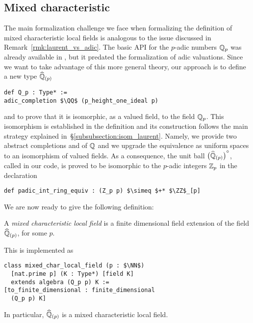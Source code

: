 \documentclass[sigplan,screen]{acmart}
\begin{document}
\subsection{Mixed characteristic}\label{subsec:mixed_char}
The main formalization challenge we face when formalizing the definition of mixed characteristic local fields is analogous to the issue discussed in Remark~\ref{rmk:laurent_vs_adic}. The basic API for the $p$-adic numbers $\mathbb{Q}_p$ was already available in \mathlib, but it predated the formalization of adic valuations. Since we want to take advantage of this more general theory, our approach is to define a new type $\widehat{\mathbb{Q}}_{(p)}$\href{https://github.com/mariainesdff/local_fields_journal/blob/0b408ff3af36e18f991f9d4cb87be3603cfc3fc3/src/padic_compare.lean#L95}{\extlink}
\begin{lstlisting}
def Q_p : Type* := 
adic_completion $\QQ$ (p_height_one_ideal p)
\end{lstlisting}
and to prove that it is isomorphic, as a valued field, to the field $\mathbb{Q}_p$. This isomorphism is established in the definition \href{https://github.com/mariainesdff/local_fields_journal/blob/0b408ff3af36e18f991f9d4cb87be3603cfc3fc3/src/padic_compare.lean#L274}{\extlink} and its construction follows the main strategy explained in~\S\ref{subsubsection:isom_laurent}. Namely, we provide two abstract completions  and  of $\mathbb{Q}$ and we upgrade the equivalence as uniform spaces to an isomorphism of valued fields. As a consequence, the unit ball ${\bigl(\widehat{\mathbb{Q}}_{(p)}\bigr)}^\circ$, called\href{https://github.com/mariainesdff/local_fields_journal/blob/0b408ff3af36e18f991f9d4cb87be3603cfc3fc3/src/padic_compare.lean#L332}{\extlink}  in our code,
is proved to be isomorphic to the $p$-adic integers $\mathbb{Z}_p$ in the declaration\href{https://github.com/mariainesdff/local_fields_journal/blob/0b408ff3af36e18f991f9d4cb87be3603cfc3fc3/src/padic_compare.lean#L573}{\extlink}
\begin{lstlisting}[caption={The isomorphism between $\padicComplInt$ and $\ZZ_p$.}, label={code:iso_Zp}]
def padic_int_ring_equiv : (Z_p p) $\simeq $+* $\ZZ$_[p]
\end{lstlisting}

We are now ready to give the following definition:
\begin{definition}\label{def:mixed_char_local_field}
A \emph{mixed characteristic local field} is a finite dimensional field extension of the field $\widehat{\mathbb{Q}}_{(p)}$, for some $p$.
\end{definition}
This is implemented as\href{https://github.com/mariainesdff/local_fields_journal/blob/0b408ff3af36e18f991f9d4cb87be3603cfc3fc3/src/mixed_characteristic/basic.lean#L41}{\extlink}
\begin{lstlisting}
class mixed_char_local_field (p : $\NN$)
  [nat.prime p] (K : Type*) [field K]
  extends algebra (Q_p p) K :=
[to_finite_dimensional : finite_dimensional
  (Q_p p) K]    
\end{lstlisting}
In particular, $\widehat{\mathbb{Q}}_{(p)}$ is a mixed characteristic local field\href{https://github.com/mariainesdff/local_fields_journal/blob/0b408ff3af36e18f991f9d4cb87be3603cfc3fc3/src/mixed_characteristic/basic.lean#L128}{\extlink}.
\end{document}
